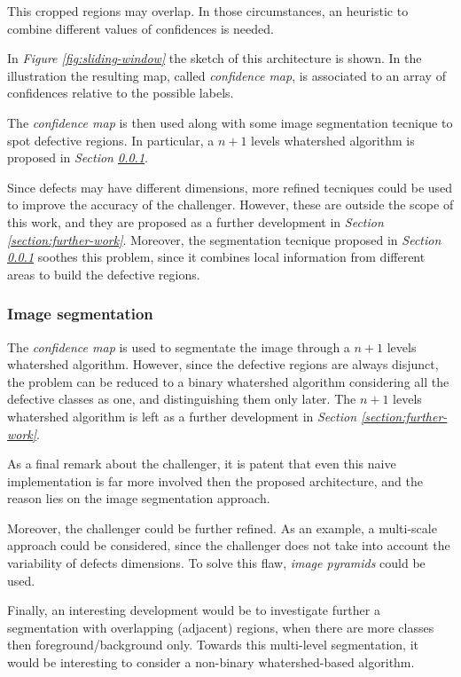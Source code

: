         \par{
            This cropped regions may overlap. In those circumstances, an heuristic to combine different values of confidences is needed.
        }
        \par{
            In \emph{Figure \ref{fig:sliding-window}} the sketch of this architecture is shown. In the illustration the resulting map, called \emph{confidence map}, is associated to an array of confidences relative to the possible labels. 
        }
        \par{
            The \emph{confidence map} is then used along with some image segmentation tecnique to spot defective regions. In particular, a $n+1$ levels whatershed algorithm is proposed in \emph{Section \ref{section:challenger:image-segmentation}}.
        }
        \par{
            Since defects may have different dimensions, more refined tecniques could be used to improve the accuracy of the challenger. However, these are outside the scope of this work, and they are proposed as a further development in \emph{Section \ref{section:further-work}}. Moreover, the segmentation tecnique proposed in \emph{Section \ref{section:challenger:image-segmentation}} soothes this problem, since it combines local information from different areas to build the defective regions.
        }
    \subsubsection{Image segmentation}\label{section:challenger:image-segmentation}
        \par{
            The \emph{confidence map} is used to segmentate the image through a $n+1$ levels whatershed algorithm. However, since the defective regions are always disjunct, the problem can be reduced to a binary whatershed algorithm \cite{ieee:87344} considering all the defective classes as one, and distinguishing them only later. The $n+1$ levels whatershed algorithm is left as a further development in \emph{Section \ref{section:further-work}}.
        }
        \par{
            As a final remark about the challenger, it is patent that even this naive implementation is far more involved then the proposed architecture, and the reason lies on the image segmentation approach.
        }
    \par{
        Moreover, the challenger could be further refined. As an example, a multi-scale approach could be considered, since the challenger does not take into account the variability of defects dimensions. To solve this flaw, \emph{image pyramids} could be used.
    }
    \par{
        Finally, an interesting development would be to investigate further a segmentation with overlapping (adjacent) regions, when there are more classes then foreground/background only. Towards this multi-level segmentation, it would be interesting to consider a non-binary whatershed-based algorithm.
    }